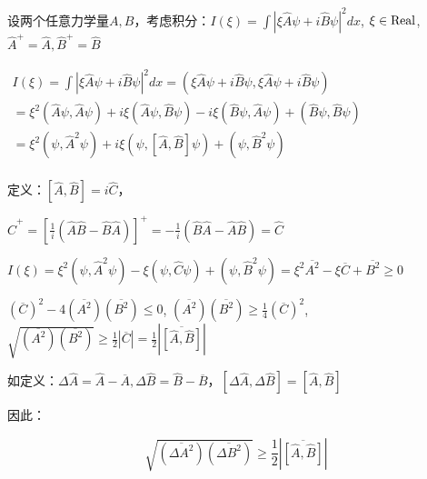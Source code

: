 设两个任意力学量$A,B$，考虑积分：$I\left( \xi  \right) = \int {\left| {\xi \hat A\psi  + i\hat B\psi } \right|^2 dx} $, $\xi  \in {\rm{Real}}$, $\hat A^ +   = \hat A,\hat B^ +   = \hat B$

\begin{center}
$\begin{array}{l}
 I\left( \xi  \right) = \int {\left| {\xi \hat A\psi  + i\hat B\psi } \right|^2 dx}  = \left( {\xi \hat A\psi  + i\hat B\psi ,\xi \hat A\psi  + i\hat B\psi } \right) \\
  = \xi ^2 \left( {\hat A\psi ,\hat A\psi } \right) + i\xi \left( {\hat A\psi ,\hat B\psi } \right) - i\xi \left( {\hat B\psi ,\hat A\psi } \right) + \left( {\hat B\psi ,\hat B\psi } \right) \\
  = \xi ^2 \left( {\psi ,\hat A^2 \psi } \right) + i\xi \left( {\psi ,\left[ {\hat A,\hat B} \right]\psi } \right) + \left( {\psi ,\hat B^2 \psi } \right) \\
 \end{array}$
\end{center}

定义：$\left[ {\hat A,\hat B} \right] = i\hat C$，

$\hat C^ +   = \left[ {\frac{1}{i}\left( {\hat A\hat B - \hat B\hat A} \right)} \right]^ +   =  - \frac{1}{i}\left( {\hat B\hat A - \hat A\hat B} \right) = \hat C$

$I\left( \xi  \right) = \xi ^2 \left( {\psi ,\hat A^2 \psi } \right) - \xi \left( {\psi ,\hat C\psi } \right) + \left( {\psi ,\hat B^2 \psi } \right) = \xi ^2 \overline {A^2 }  - \xi \overline C  + \overline {B^2 }  \ge 0$

$\left( {\overline C } \right)^2  - 4\left( {\overline {A^2 } } \right)\left( {\overline {B^2 } } \right) \le 0$, $\left( {\overline {A^2 } } \right)\left( {\overline {B^2 } } \right) \ge \frac{1}{4}\left( {\overline C } \right)^2 $, $\sqrt {\left( {\overline {A^2 } } \right)\left( {\overline {B^2 } } \right)}  \ge \frac{1}{2}\left| {\overline C } \right| = \frac{1}{2}\left| {\overline {\left[ {\hat A,\hat B} \right]} } \right|$

如定义：$\Delta \hat A = \hat A - \overline A ,\Delta \hat B = \hat B - \overline B $，$\left[ {\Delta \hat A,\Delta \hat B} \right] = \left[ {\hat A,\hat B} \right]$

因此：

\begin{equation}\label{unceratinty principle strict}
\sqrt {\left( {\overline {\Delta A^2 } } \right)\left( {\overline
{\Delta B^2 } } \right)}  \ge \frac{1}{2}\left| {\overline {\left[
{\hat A,\hat B} \right]} } \right|
\end{equation}



